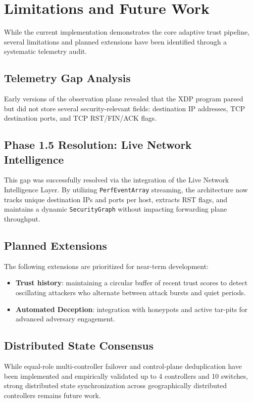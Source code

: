 \documentclass[conference]{IEEEtran}
\begin{document}

\section{Limitations and Future Work}

While the current implementation demonstrates the core adaptive trust pipeline, several limitations and planned extensions have been identified through a systematic telemetry audit.

\subsection{Telemetry Gap Analysis}
Early versions of the observation plane revealed that the XDP program parsed but did not store several security-relevant fields: destination IP addresses, TCP destination ports, and TCP RST/FIN/ACK flags. 

\subsection{Phase 1.5 Resolution: Live Network Intelligence}
This gap was successfully resolved via the integration of the Live Network Intelligence Layer. By utilizing \texttt{PerfEventArray} streaming, the architecture now tracks unique destination IPs and ports per host, extracts RST flags, and maintains a dynamic \texttt{SecurityGraph} without impacting forwarding plane throughput.

\subsection{Planned Extensions}
The following extensions are prioritized for near-term development:
\begin{itemize}
\item \textbf{Trust history}: maintaining a circular buffer of recent trust scores to detect oscillating attackers who alternate between attack bursts and quiet periods.
\item \textbf{Automated Deception}: integration with honeypots and active tar-pits for advanced adversary engagement.
\end{itemize}

\subsection{Distributed State Consensus}
While equal-role multi-controller failover and control-plane deduplication have been implemented and empirically validated up to 4 controllers and 10 switches, strong distributed state synchronization across geographically distributed controllers remains future work.
\end{document}
